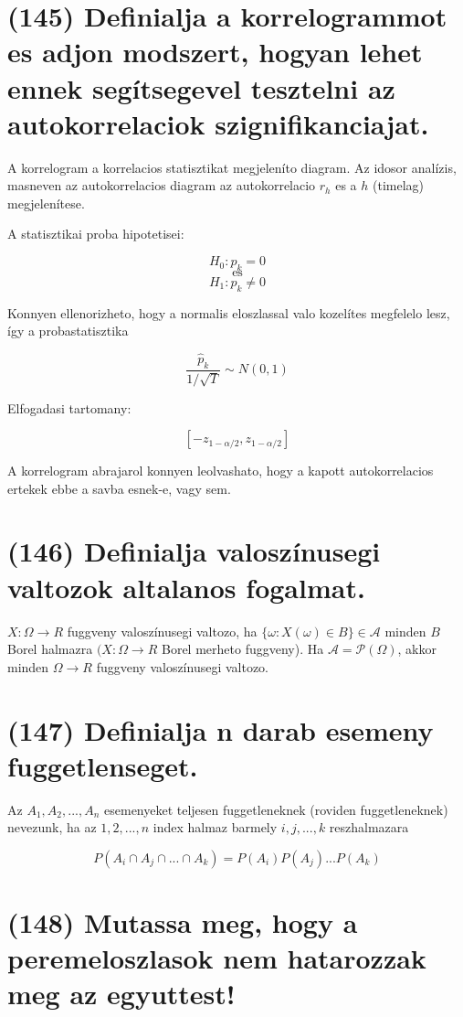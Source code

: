\documentclass[12p]{article}
\begin{document}
\section{(145) Definialja a korrelogrammot es adjon modszert, hogyan lehet ennek segítsegevel tesztelni
az autokorrelaciok szignifikanciajat.}

A korrelogram a korrelacios statisztikat megjeleníto diagram. Az idosor analízis, masneven az autokorrelacios diagram az autokorrelacio $r_h$ es a $h$ (timelag) megjelenítese.

A statisztikai proba hipotetisei:

$$H_0 : p_k = 0$$
\[
	\text{es}
\]
$$H_1 : p_k \neq 0$$

Konnyen ellenorizheto, hogy a normalis eloszlassal valo kozelítes megfelelo
lesz, így a probastatisztika

$$\frac{\hat{p}_k}{1/\sqrt{T}} \sim N(0,1) $$

Elfogadasi tartomany:

$$[-z_{1-\alpha/2},z_{1-\alpha/2}]$$

A korrelogram abrajarol konnyen leolvashato, hogy a kapott autokorrelacios
ertekek ebbe a savba esnek-e, vagy sem.

\section{(146) Definialja valoszínusegi valtozok altalanos fogalmat.}

$X : \Omega \rightarrow R$ fuggveny valoszínusegi valtozo, ha $\{\omega: X(\omega) \in B\} \in \mathscr{A}$ minden $B$ Borel halmazra $(X: \Omega \rightarrow R$ Borel merheto fuggveny).
Ha $\mathscr{A} = \mathscr{P}(\Omega)$, akkor minden $\Omega \rightarrow R$ fuggveny valoszínusegi valtozo.


\section{(147) Definialja n darab esemeny fuggetlenseget.}

Az $A_1,A_2, ..., A_n$ esemenyeket teljesen fuggetleneknek (roviden fuggetleneknek) nevezunk, ha az ${1, 2, ..., n}$ index halmaz barmely ${i, j, ..., k}$ reszhalmazara

$$P(A_i \cap A_j \cap ... \cap A_k) = P(A_i)P(A_j)...P(A_k)$$

\section{(148) Mutassa meg, hogy a peremeloszlasok nem hatarozzak meg az egyuttest!}
\end{document}
